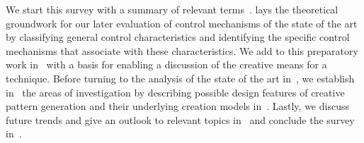 


We start this survey with a summary of relevant terms~.  lays the theoretical groundwork for our later evaluation of control mechanisms of the state of the art by classifying general control characteristics and identifying the specific control mechanisms that associate with these characteristics. We add to this preparatory work in~ with a basis for enabling a discussion of the creative means for a technique. Before turning to the analysis of the state of the art in~, we establish in~ the areas of investigation by describing possible design features of creative pattern generation and their underlying creation models in~. Lastly, we discuss future trends and give an outlook to relevant topics in~ and conclude the survey in~.
